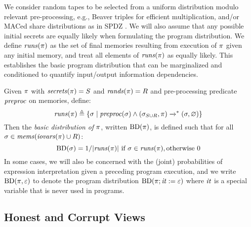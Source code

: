 We consider random tapes to be selected from a uniform distribution
modulo relevant pre-processing, e.g., Beaver triples for efficient
multiplication, and/or MACed share distributions as in SPDZ \cite{XXX}.
We will also assume that any possible initial secrets
are equally likely when formulating the program distribution.
We define $\mathit{runs}(\pi)$ as the set of final memories resulting
from execution of $\pi$ given any initial memory, and
treat all elements of $\mathit{runs}(\pi)$ as equally likely.
This establishes the basic program distribution that can be
marginalized and conditioned to quantify input/output
information dependencies. 
\begin{definition}
  \label{def-progd}
  \label{definition-progd}
  Given $\pi$ with $\mathit{secrets}(\pi) = S$ and $\mathit{rands}(\pi) = R$ and
  pre-processing predicate $\mathit{preproc}$ on memories, define:
  $$
  \mathit{runs}(\pi) \triangleq \{ \sigma \mid \mathit{preproc}(\sigma) \wedge
  (\sigma_{S \cup R},\pi) \xrightarrow{}^{*} (\sigma,\varnothing) \}
  $$
  Then the \emph{basic distribution of $\pi$}, written $\mathrm{BD}(\pi)$, is
  defined such that for all $\sigma \in \mathit{mems}(\mathit{iovars}(\pi) \cup R)$:
  $$
  \mathrm{BD}(\sigma) =  1 / |\mathit{runs}(\pi)| \ \text{if}\ \sigma \in \mathit{runs}(\pi), \text{otherwise}\ 0
  $$
  In some cases, we will also be concerned with the (joint)
  probabilities of expression interpretation given a preceding program
  execution, and we write $\mathrm{BD}(\pi, \varepsilon)$ to denote the program
  distribution $\mathrm{BD}(\pi;\mathit{it} := \varepsilon)$ where $\mathit{it}$ is a
  special variable that is never used in programs.
\end{definition}


\subsection{Honest and Corrupt Views}

